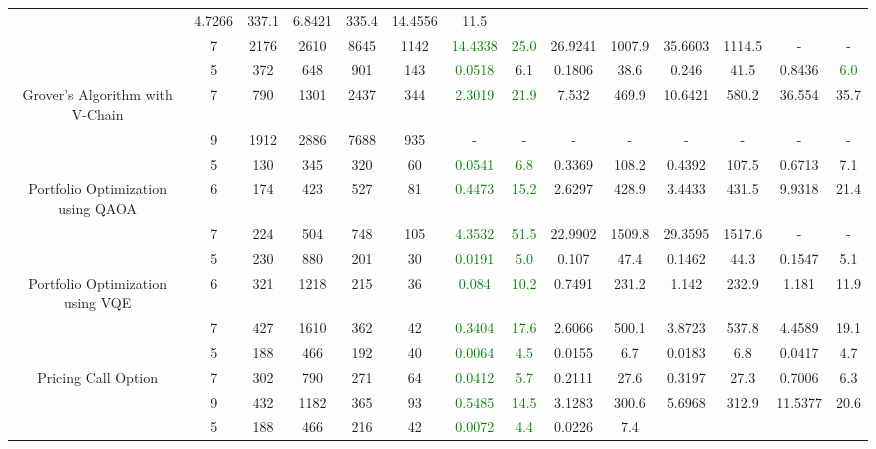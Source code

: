 \begin{table}[htb]
{\begin{tabular}{|c|c|c|c|c|c|c|c|c|c|c|c|c|c|}
 & 4.7266 & 337.1
 & 6.8421 & 335.4
 & 14.4556 & 11.5
 \\
 & 
7 & 2176 & 2610 & 8645 & 1142
 & \textcolor{green}{14.4338} & \textcolor{green}{25.0}
 & 26.9241 & 1007.9
 & 35.6603 & 1114.5
 & - & -
 \\
\hline
 & 
5 & 372 & 648 & 901 & 143
 & \textcolor{green}{0.0518} & 6.1
 & 0.1806 & 38.6
 & 0.246 & 41.5
 & 0.8436 & \textcolor{green}{6.0}
 \\
Grover's Algorithm with V-Chain & 
7 & 790 & 1301 & 2437 & 344
 & \textcolor{green}{2.3019} & \textcolor{green}{21.9}
 & 7.532 & 469.9
 & 10.6421 & 580.2
 & 36.554 & 35.7
 \\
 & 
9 & 1912 & 2886 & 7688 & 935
 & - & -
 & - & -
 & - & -
 & - & -
 \\
\hline
 & 
5 & 130 & 345 & 320 & 60
 & \textcolor{green}{0.0541} & \textcolor{green}{6.8}
 & 0.3369 & 108.2
 & 0.4392 & 107.5
 & 0.6713 & 7.1
 \\
Portfolio Optimization using QAOA & 
6 & 174 & 423 & 527 & 81
 & \textcolor{green}{0.4473} & \textcolor{green}{15.2}
 & 2.6297 & 428.9
 & 3.4433 & 431.5
 & 9.9318 & 21.4
 \\
 & 
7 & 224 & 504 & 748 & 105
 & \textcolor{green}{4.3532} & \textcolor{green}{51.5}
 & 22.9902 & 1509.8
 & 29.3595 & 1517.6
 & - & -
 \\
\hline
 & 
5 & 230 & 880 & 201 & 30
 & \textcolor{green}{0.0191} & \textcolor{green}{5.0}
 & 0.107 & 47.4
 & 0.1462 & 44.3
 & 0.1547 & 5.1
 \\
Portfolio Optimization using VQE & 
6 & 321 & 1218 & 215 & 36
 & \textcolor{green}{0.084} & \textcolor{green}{10.2}
 & 0.7491 & 231.2
 & 1.142 & 232.9
 & 1.181 & 11.9
 \\
 & 
7 & 427 & 1610 & 362 & 42
 & \textcolor{green}{0.3404} & \textcolor{green}{17.6}
 & 2.6066 & 500.1
 & 3.8723 & 537.8
 & 4.4589 & 19.1
 \\
\hline
 & 
5 & 188 & 466 & 192 & 40
 & \textcolor{green}{0.0064} & \textcolor{green}{4.5}
 & 0.0155 & 6.7
 & 0.0183 & 6.8
 & 0.0417 & 4.7
 \\
Pricing Call Option & 
7 & 302 & 790 & 271 & 64
 & \textcolor{green}{0.0412} & \textcolor{green}{5.7}
 & 0.2111 & 27.6
 & 0.3197 & 27.3
 & 0.7006 & 6.3
 \\
 & 
9 & 432 & 1182 & 365 & 93
 & \textcolor{green}{0.5485} & \textcolor{green}{14.5}
 & 3.1283 & 300.6
 & 5.6968 & 312.9
 & 11.5377 & 20.6
 \\
\hline
 & 
5 & 188 & 466 & 216 & 42
 & \textcolor{green}{0.0072} & \textcolor{green}{4.4}
 & 0.0226 & 7.4

\end{tabular}}
\end{table}
